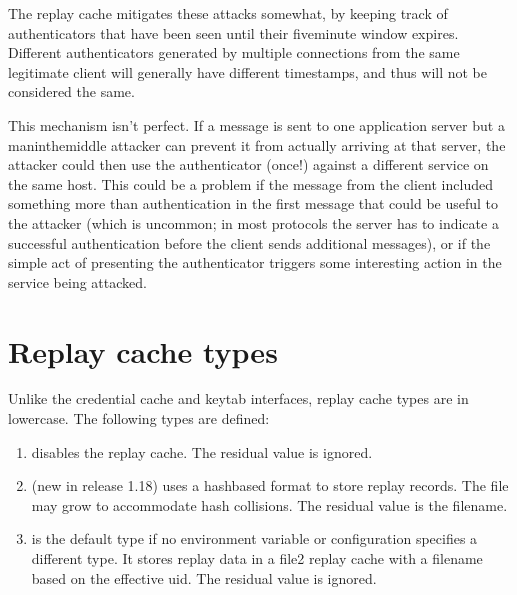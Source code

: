 \documentclass[letterpaper,10pt,english]{sphinxmanual}
\begin{document}
\sphinxAtStartPar
The replay cache mitigates these attacks somewhat, by keeping track of
authenticators that have been seen until their five\sphinxhyphen{}minute window
expires.  Different authenticators generated by multiple connections
from the same legitimate client will generally have different
timestamps, and thus will not be considered the same.

\sphinxAtStartPar
This mechanism isn’t perfect.  If a message is sent to one application
server but a man\sphinxhyphen{}in\sphinxhyphen{}the\sphinxhyphen{}middle attacker can prevent it from actually
arriving at that server, the attacker could then use the authenticator
(once!) against a different service on the same host.  This could be a
problem if the message from the client included something more than
authentication in the first message that could be useful to the
attacker (which is uncommon; in most protocols the server has to
indicate a successful authentication before the client sends
additional messages), or if the simple act of presenting the
authenticator triggers some interesting action in the service being
attacked.


\section{Replay cache types}
\label{\detokenize{basic/rcache_def:replay-cache-types}}
\sphinxAtStartPar
Unlike the credential cache and keytab interfaces, replay cache types
are in lowercase.  The following types are defined:
\begin{enumerate}
%
\item {} 
\sphinxAtStartPar
{} disables the replay cache.  The residual value is ignored.

\item {} 
\sphinxAtStartPar
{} (new in release 1.18) uses a hash\sphinxhyphen{}based format to store
replay records.  The file may grow to accommodate hash collisions.
The residual value is the filename.

\item {} 
\sphinxAtStartPar
{} is the default type if no environment variable or
configuration specifies a different type.  It stores replay data in
a file2 replay cache with a filename based on the effective uid.
The residual value is ignored.

\end{enumerate}
\end{document}
